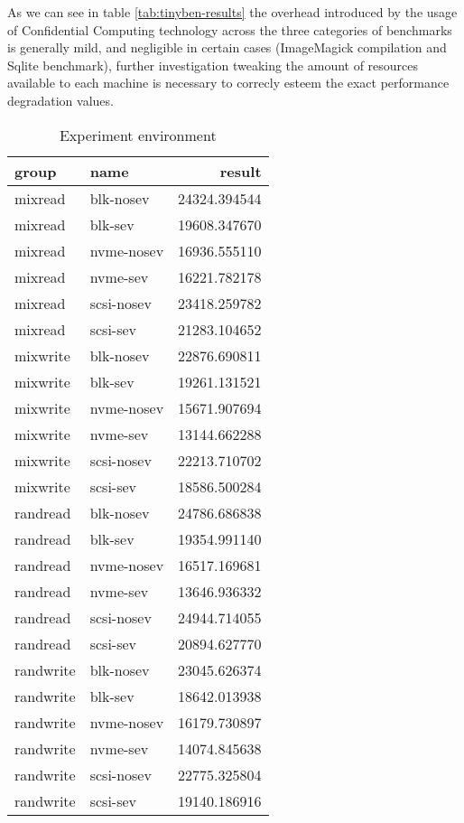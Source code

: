 \documentclass[twocolumn]{article}
\begin{document}
As we can see in table \ref{tab:tinyben-results} the overhead introduced by the usage of Confidential Computing technology across the three categories of benchmarks is generally mild, and negligible in certain cases (ImageMagick compilation and Sqlite benchmark), further investigation tweaking the amount of resources available to each machine is necessary to correcly esteem the exact performance degradation values.
\begin{table*}
    \centering
    \label{tab:iops-results}
    \begin{tabular}{|l|l|r|}
        \hline
        group &       name &       result \\
        \hline
        mixread &  blk-nosev & 24324.394544 \\
        mixread &    blk-sev & 19608.347670 \\
        mixread & nvme-nosev & 16936.555110 \\
        mixread &   nvme-sev & 16221.782178 \\
        mixread & scsi-nosev & 23418.259782 \\
        mixread &   scsi-sev & 21283.104652 \\
        mixwrite &  blk-nosev & 22876.690811 \\
        mixwrite &    blk-sev & 19261.131521 \\
        mixwrite & nvme-nosev & 15671.907694 \\ 
        mixwrite &   nvme-sev & 13144.662288 \\
        mixwrite & scsi-nosev & 22213.710702 \\
        mixwrite &   scsi-sev & 18586.500284 \\
        randread &  blk-nosev & 24786.686838 \\
        randread &    blk-sev & 19354.991140 \\
        randread & nvme-nosev & 16517.169681 \\
        randread &   nvme-sev & 13646.936332 \\
        randread & scsi-nosev & 24944.714055 \\
        randread &   scsi-sev & 20894.627770 \\
        randwrite &  blk-nosev & 23045.626374 \\
        randwrite &    blk-sev & 18642.013938 \\
        randwrite & nvme-nosev & 16179.730897 \\
        randwrite &   nvme-sev & 14074.845638 \\
        randwrite & scsi-nosev & 22775.325804 \\
        randwrite &   scsi-sev & 19140.186916 \\
        \hline  
    \end{tabular}
    \caption{Experiment environment}
\end{table*}
\end{document}
